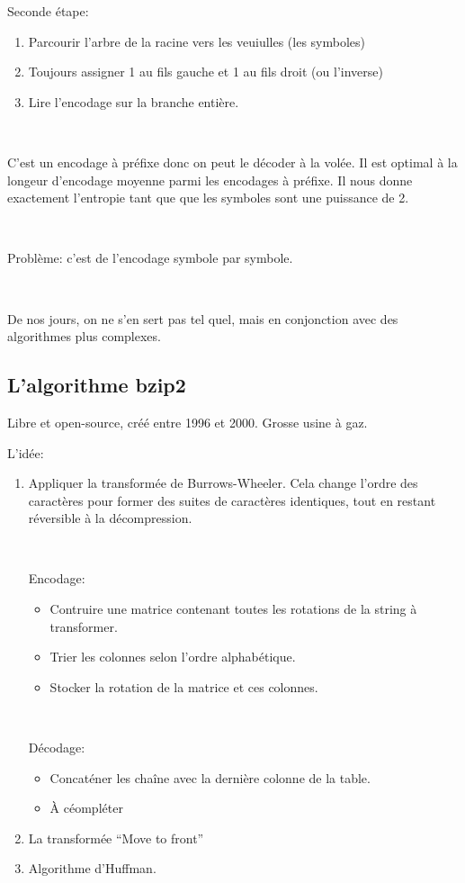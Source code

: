 \documentclass[a4paper,11pt]{article}
\begin{document}
Seconde étape:

\begin{enumerate}
\item Parcourir l'arbre de la racine vers les veuiulles (les symboles)
\item Toujours assigner 1 au fils gauche et 1 au fils droit (ou l'inverse)
\item Lire l'encodage sur la branche entière.
\end{enumerate}

\

C'est un encodage à préfixe donc on peut le décoder à la volée. Il est optimal à
la longeur d'encodage moyenne parmi les encodages à préfixe. Il nous donne
exactement l'entropie tant que que les symboles sont une puissance de 2.

\

Problème: c'est de l'encodage symbole par symbole.

\

De nos jours, on ne s'en sert pas tel quel, mais en conjonction avec des
algorithmes plus complexes.

\subsection{L'algorithme bzip2}

Libre et open-source, créé entre 1996 et 2000. Grosse usine à gaz.

L'idée:

\begin{enumerate}
\item Appliquer la transformée de Burrows-Wheeler. Cela change l'ordre des
  caractères pour former des suites de caractères identiques, tout en restant
  réversible à la décompression.

  \

  Encodage:
  \begin{itemize}
  \item Contruire une matrice contenant toutes les rotations de la string à
    transformer.
  \item Trier les colonnes selon l'ordre alphabétique.
  \item Stocker la rotation de la matrice et ces colonnes.
  \end{itemize}

  \

  Décodage:

  \begin{itemize}
  \item Concaténer les chaîne avec la dernière colonne de la table.
  \item À céompléter
  \end{itemize}

\item La transformée ``Move to front''

\item Algorithme d'Huffman.

\end{enumerate}
\end{document}
